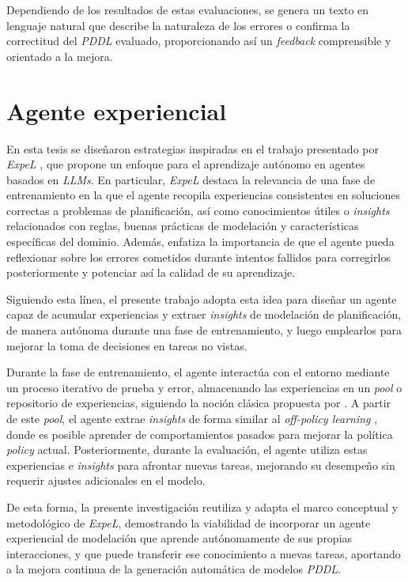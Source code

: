 Dependiendo de los resultados de estas evaluaciones, se genera un texto en lenguaje natural que describe la naturaleza de los errores o confirma la correctitud del \textit{PDDL} evaluado, proporcionando así un \textit{feedback} comprensible y orientado a la mejora.

\section{Agente experiencial}

En esta tesis se diseñaron estrategias inspiradas en el trabajo presentado por \textit{ExpeL} \parencite{zhao2024expel}, que propone un enfoque para el aprendizaje autónomo en agentes basados en \textit{LLMs}. En particular, \textit{ExpeL} destaca la relevancia de una fase de entrenamiento en la que el agente recopila experiencias consistentes en soluciones correctas a problemas de planificación, así como conocimientos útiles o \textit{insights} relacionados con reglas, buenas prácticas de modelación y características específicas del dominio. Además, enfatiza la importancia de que el agente pueda reflexionar sobre los errores cometidos durante intentos fallidos para corregirlos posteriormente y potenciar así la calidad de su aprendizaje.

Siguiendo esta línea, el presente trabajo adopta esta idea para diseñar un agente capaz de acumular experiencias y extraer \textit{insights} de modelación de planificación, de manera autónoma durante una fase de entrenamiento, y luego emplearlos para mejorar la toma de decisiones en tareas no vistas.

Durante la fase de entrenamiento, el agente interactúa con el entorno mediante un proceso iterativo de prueba y error, almacenando las experiencias en un \textit{pool} o repositorio de experiencias, siguiendo la noción clásica propuesta por \parencite{lin1992self}. A partir de este \textit{pool}, el agente extrae \textit{insights} de forma similar al \textit{off-policy learning} \parencite{watkins1992q}, donde es posible aprender de comportamientos pasados para mejorar la política \textit{policy} actual. Posteriormente, durante la evaluación, el agente utiliza estas experiencias e \textit{insights} para afrontar nuevas tareas, mejorando su desempeño sin requerir ajustes adicionales en el modelo.

De esta forma, la presente investigación reutiliza y adapta el marco conceptual y metodológico de \textit{ExpeL}, demostrando la viabilidad de incorporar un agente experiencial de modelación que aprende autónomamente de sus propias interacciones, y que puede transferir ese conocimiento a nuevas tareas, aportando a la mejora continua de la generación automática de modelos \textit{PDDL}.

